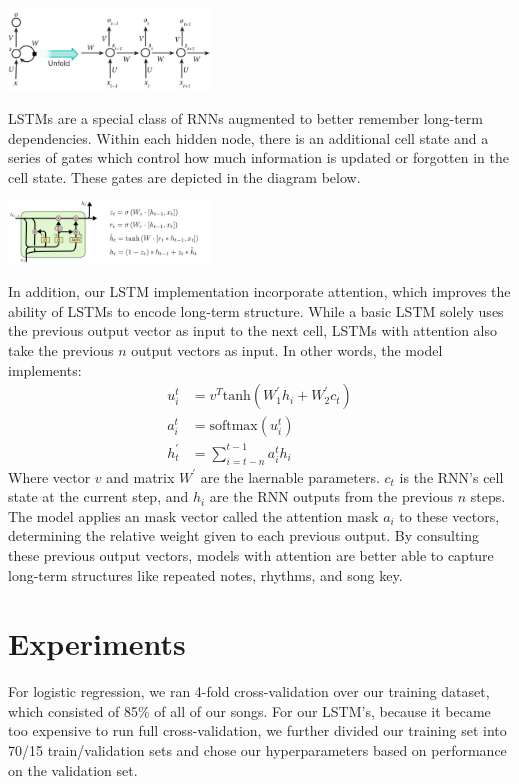 \documentclass[twoside,twocolumn]{article}
\begin{document}
\includegraphics[width = 0.4\textwidth]{rnn-diagram}

LSTMs are a special class of RNNs augmented to better remember long-term dependencies. Within each hidden node, there is an additional cell state and a series of gates which control how much information is updated or forgotten in the cell state. These gates are depicted in the diagram below.

\includegraphics[width = 0.4\textwidth]{colah-lstm-diagram}

In addition, our LSTM implementation incorporate attention, which improves the ability of LSTMs to encode long-term structure. While a basic LSTM solely uses the previous output vector as input to the next cell, LSTMs with attention also take the previous $n$ output vectors as input. In other words, the model implements:
\begin{align}
u_i^t &= v^T \text{tanh}(W_1^\prime h_i + W_2^\prime c_t) \\
a_i^t &= \text{softmax}(u_i^t) \\
h_t^\prime &= \sum_{i=t-n}^{t-1} a_i^t h_i
\end{align}
Where vector $v$ and matrix $W^\prime$ are the laernable parameters. $c_t$ is the RNN's cell state at the current step, and $h_i$ are the RNN outputs from the previous $n$ steps. The model applies an mask vector called the attention mask  $a_i$ to these vectors, determining the relative weight given to each previous output. By consulting these previous output vectors, models with attention are better able to capture long-term structures like repeated notes, rhythms, and song key. \\


\section{Experiments}

For logistic regression, we ran 4-fold cross-validation over our training dataset, which consisted of 85\% of all of our songs. For our LSTM's, because it became too expensive to run full cross-validation, we further divided our training set into 70/15 train/validation sets and chose our hyperparameters based on performance on the  validation set. 
\end{document}
